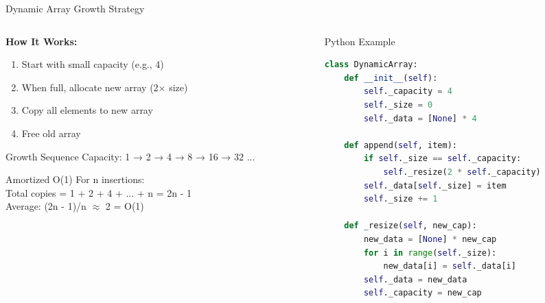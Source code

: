 \documentclass[aspectratio=169,xcolor=dvipsnames]{beamer}
\begin{document}
\begin{frame}[fragile]{Dynamic Array Growth Strategy}
  \begin{columns}
    \begin{column}{0.55\textwidth}
      \textbf{How It Works:}
      \begin{enumerate}
        \item Start with small capacity (e.g., 4)
        \item When full, allocate new array (2× size)
        \item Copy all elements to new array
        \item Free old array
      \end{enumerate}

      \vspace{0.3cm}

      \begin{exampleblock}{Growth Sequence}
        Capacity: 1 → 2 → 4 → 8 → 16 → 32 ...
      \end{exampleblock}

      \vspace{0.3cm}

      \begin{alertblock}{Amortized O(1)}
        For n insertions: \\
        Total copies = 1 + 2 + 4 + ... + n = 2n - 1 \\
        Average: (2n - 1)/n $\approx$ 2 = O(1)
      \end{alertblock}
    \end{column}
    \begin{column}{0.4\textwidth}
      \begin{exampleblock}{Python Example}
        \begin{lstlisting}[language=Python,basicstyle=\tiny\ttfamily]
class DynamicArray:
    def __init__(self):
        self._capacity = 4
        self._size = 0
        self._data = [None] * 4

    def append(self, item):
        if self._size == self._capacity:
            self._resize(2 * self._capacity)
        self._data[self._size] = item
        self._size += 1

    def _resize(self, new_cap):
        new_data = [None] * new_cap
        for i in range(self._size):
            new_data[i] = self._data[i]
        self._data = new_data
        self._capacity = new_cap
        \end{lstlisting}
      \end{exampleblock}
    \end{column}
  \end{columns}
\end{frame}
\end{document}
